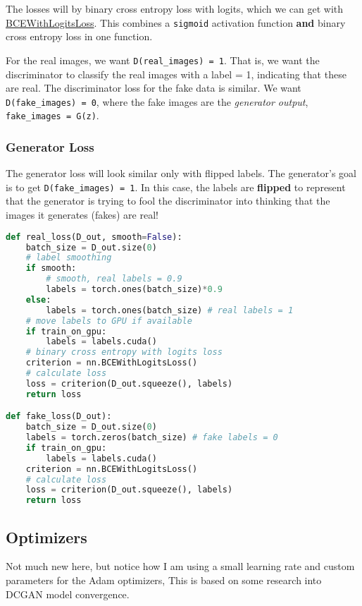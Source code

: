 The losses will by binary cross entropy loss with logits, which we can
get with
\href{https://pytorch.org/docs/stable/nn.html\#bcewithlogitsloss}{BCEWithLogitsLoss}.
This combines a \lstinline{sigmoid} activation function
\textbf{and} binary cross entropy loss in one function.

For the real images, we want
\lstinline{D(real_images) = 1}. That is, we want the
discriminator to classify the real images with a label = 1, indicating
that these are real. The discriminator loss for the fake data is
similar. We want \lstinline{D(fake_images) = 0}, where
the fake images are the \emph{generator output},
\lstinline{fake_images = G(z)}.

\subsubsection{Generator Loss}

The generator loss will look similar only with flipped labels. The
generator's goal is to get
\lstinline{D(fake_images) = 1}. In this case, the labels
are \textbf{flipped} to represent that the generator is trying to fool
the discriminator into thinking that the images it generates (fakes) are
real!

\begin{lstlisting}[language=Python]
def real_loss(D_out, smooth=False):
    batch_size = D_out.size(0)
    # label smoothing
    if smooth:
        # smooth, real labels = 0.9
        labels = torch.ones(batch_size)*0.9
    else:
        labels = torch.ones(batch_size) # real labels = 1
    # move labels to GPU if available     
    if train_on_gpu:
        labels = labels.cuda()
    # binary cross entropy with logits loss
    criterion = nn.BCEWithLogitsLoss()
    # calculate loss
    loss = criterion(D_out.squeeze(), labels)
    return loss

def fake_loss(D_out):
    batch_size = D_out.size(0)
    labels = torch.zeros(batch_size) # fake labels = 0
    if train_on_gpu:
        labels = labels.cuda()
    criterion = nn.BCEWithLogitsLoss()
    # calculate loss
    loss = criterion(D_out.squeeze(), labels)
    return loss
\end{lstlisting}

\subsection{Optimizers}

Not much new here, but notice how I am using a small learning rate and
custom parameters for the Adam optimizers, This is based on some
research into DCGAN model convergence.


